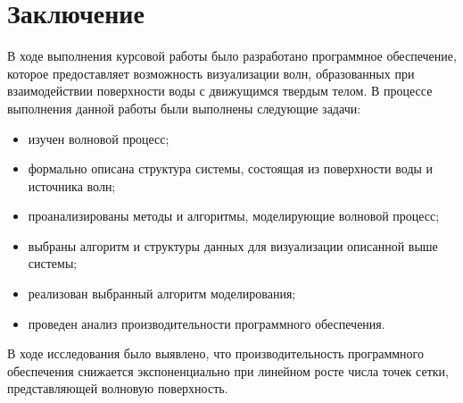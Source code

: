 \chapter*{Заключение}

В ходе выполнения курсовой работы было разработано программное обеспечение, которое предоставляет возможность визуализации волн, образованных при взаимодействии поверхности воды с движущимся твердым телом. В процессе выполнения данной работы были выполнены следующие задачи:

\begin{itemize}
	\item изучен волновой процесс;
	\item формально описана структура системы, состоящая из поверхности воды и источника волн;
	\item проанализированы методы и алгоритмы, моделирующие волновой процесс;
	\item выбраны алгоритм и структуры данных для визуализации описанной выше системы;
	\item реализован выбранный алгоритм моделирования;
	\item проведен анализ производительности программного обеспечения.
\end{itemize}

В ходе исследования было выявлено, что производительность программного обеспечения снижается экспоненциально при линейном росте числа точек сетки, представляющей волновую поверхность.